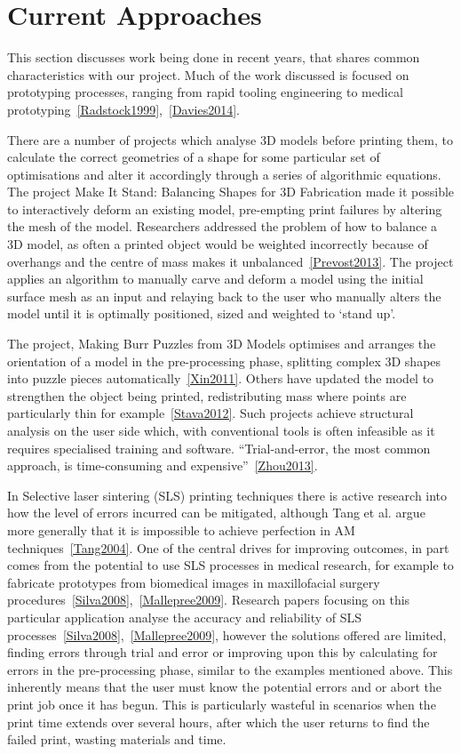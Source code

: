 \documentclass[11pt]{report} %
\begin{document}
\section{Current Approaches}
\label{section:CurrentApproaches}
This section discusses work being done in recent years, that shares common characteristics with our project. Much of the work discussed is focused on prototyping processes, ranging from rapid tooling engineering to medical prototyping~\ref{Radstock1999},~\ref{Davies2014}. 

There are a number of projects which analyse 3D models before printing them, to calculate the correct geometries of a shape for some particular set of optimisations and alter it accordingly through a series of algorithmic equations. The project Make It Stand: Balancing Shapes for 3D Fabrication made it possible to interactively deform an existing model, pre-empting print failures by altering the mesh of the model. Researchers addressed the problem of how to balance a 3D model, as often a printed object would be weighted incorrectly because of overhangs and the centre of mass makes it unbalanced~\ref{Prevost2013}. The project applies an algorithm to manually carve and deform a model using the initial surface mesh as an input and relaying back to the user who manually alters the model until it is optimally positioned, sized and weighted to `stand up'. 

The project, Making Burr Puzzles from 3D Models optimises and arranges the orientation of a model in the pre-processing phase, splitting complex 3D shapes into puzzle pieces automatically~\ref{Xin2011}. Others have updated the model to strengthen the object being printed, redistributing mass where points are particularly thin for example~\ref{Stava2012}. Such projects achieve structural analysis on the user side which, with conventional tools is often infeasible as it requires specialised training and software. ``Trial-and-error, the most common approach, is time-consuming and expensive''~\ref{Zhou2013}. 

In Selective laser sintering (SLS) printing techniques there is active research into how the level of errors incurred can be mitigated, although Tang et al. argue more generally that it is impossible to achieve perfection in AM techniques~\ref{Tang2004}. One of the central drives for improving outcomes, in part comes from the potential to use SLS processes in medical research, for example to fabricate prototypes from biomedical images in maxillofacial surgery procedures~\ref{Silva2008},~\ref{Mallepree2009}. Research papers focusing on this particular application analyse the accuracy and reliability of SLS processes~\ref{Silva2008},~\ref{Mallepree2009}, however the solutions offered are limited, finding errors through trial and error or improving upon this by calculating for errors in the pre-processing phase, similar to the examples mentioned above. This inherently means that the user must know the potential errors and or abort the print job once it has begun. This is particularly wasteful in scenarios when the print time extends over several hours, after which the user returns to find the failed print, wasting materials and time. 
\end{document}
